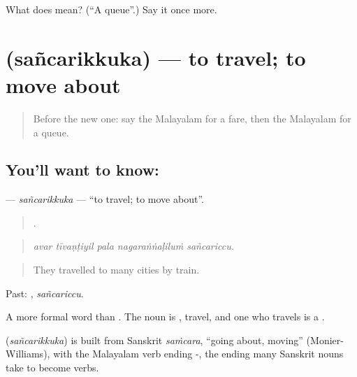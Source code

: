 \begin{tcolorbox}[breakable,colback=teal!4,colframe=teal!35!black,title={Before you move on}]
What does  mean? (\textquotedblleft{}A queue\textquotedblright{}.) Say it once more.
\end{tcolorbox}
\section[\texorpdfstring{\ml{സഞ്ചരിക്കുക} (sañcarikkuka)}{സഞ്ചരിക്കുക (sañcarikkuka)}]{ (sañcarikkuka) — to travel; to move about}

\label{lesson:ML-C461-sancarikkuka}



\begin{quote}
Before the new one: say the Malayalam for a fare, then the Malayalam for a queue.
\end{quote}

\subsection*{You'll want to know: }
\textbf{} — \emph{sañcarikkuka} — \textquotedblleft{}to travel; to move about\textquotedblright{}.

\begin{quote}
    .
\end{quote}

\begin{quote}
\emph{avar tīvaṇṭiyil pala nagaraṅṅaḷiluṁ sañcariccu.}
\end{quote}

\begin{quote}
They travelled to many cities by train.
\end{quote}

Past: , \emph{sañcariccu}.

A more formal word than  . The noun is , travel, and one who travels is a .

\begin{cousinweb}
\textbf{} (\emph{sañcarikkuka}) is built from Sanskrit \emph{saṁcara}, \textquotedblleft{}going about, moving\textquotedblright{} (Monier-Williams), with the Malayalam verb ending -, the ending many Sanskrit nouns take to become verbs.
\end{cousinweb}

